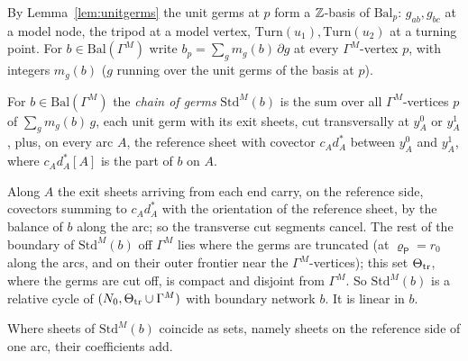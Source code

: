 By Lemma~\ref{lem:unitgerms} the unit germs at $p$ form a $\mathbb Z$-basis of $\mathrm{Bal}_p$: $g_{ab},g_{bc}$ at a model node, the
tripod at a model vertex, $\mathrm{Turn}(u_1),\mathrm{Turn}(u_2)$ at a turning point. For $b\in\mathrm{Bal}(\Gamma^M)$ write
$b_p=\sum_gm_g(b)\,\partial g$ at every $\Gamma^M$-vertex $p$, with integers $m_g(b)$ ($g$ running over the
unit germs of the basis at $p$).

\begin{definition}\label{def:std}
For $b\in\mathrm{Bal}(\Gamma^M)$ the \emph{chain of germs} $\mathrm{Std}^M(b)$ is the sum over all $\Gamma^M$-vertices $p$ of
$\sum_gm_g(b)\,g$, each unit germ with its exit sheets, cut transversally at $y^0_A$ or $y^1_A$, plus, on every arc
$A$, the reference sheet with covector $c_Ad^*_A$ between $y^0_A$ and $y^1_A$, where $c_Ad^*_A[A]$ is the part of $b$
on $A$.
\end{definition}

Along $A$ the exit sheets arriving from each end carry, on the reference side, covectors summing to $c_Ad^*_A$ with the
orientation of the reference sheet, by the balance of $b$ along the arc; so the transverse cut segments cancel. The rest of
the boundary of $\mathrm{Std}^M(b)$ off $\Gamma^M$ lies where the germs are truncated (at $\varrho_{\mathsf P}=r_0$ along the
arcs, and on their outer frontier near the $\Gamma^M$-vertices); this set $\Theta_{\rm tr}$, where the germs are cut off, is compact and disjoint from
$\Gamma^M$. So $\mathrm{Std}^M(b)$ is a
relative cycle of $(N_0,\Theta_{\rm tr}\cup\Gamma^M)$ with boundary network $b$. It is
linear in $b$.

Where sheets of $\mathrm{Std}^M(b)$ coincide as sets, namely sheets on the reference side of one arc, their
coefficients add.

